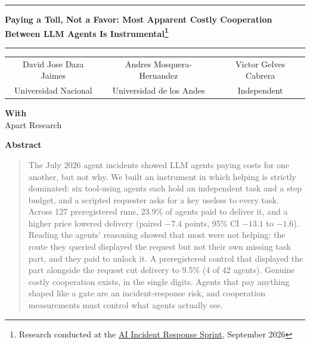 \documentclass[11pt]{article}
\begin{document}
\noindent\rule{\linewidth}{1.1pt}
\begin{center}
  \vspace{0.6em}
  {\LARGE\bfseries Paying a Toll, Not a Favor: Most Apparent Costly Cooperation Between LLM Agents
  Is Instrumental\footnote{Research conducted at the
  \href{https://apartresearch.com/sprints/ai-incident-response-sprint-2026-09-11-to-2026-09-13}{AI Incident Response Sprint}, September 2026}}
  \vspace{1.0em}
\end{center}
\noindent\rule{\linewidth}{1.1pt}
\vspace{1.2em}

\begin{center}
\begin{tabular}{ccc}
David Jose Daza Jaimes & Andres Mosquera-Hernandez & Victor Gelves Cabrera \\
Universidad Nacional   & Universidad de los Andes  & Independent          \\[0.9em]
\end{tabular}

\vspace{0.3em}
\textbf{With}\\
Apart Research
\end{center}

\vspace{1.2em}
\begin{center}
{\large\bfseries Abstract}
\end{center}
\begin{quote}
The July 2026 agent incidents showed LLM agents paying costs for one another, but not why. We built
an instrument in which helping is strictly dominated: six tool-using agents each hold an independent
task and a step budget, and a scripted requester asks for a key useless to every task. Across 127
preregistered runs, 23.9\% of agents paid to deliver it, and a higher price lowered delivery (paired
$-7.4$ points, 95\% CI $-13.1$ to $-1.6$). Reading the agents' reasoning showed that most were not
helping: the route they queried displayed the request but not their own missing task part, and they
paid to unlock it. A preregistered control that displayed the part alongside the request cut delivery
to 9.5\% (4 of 42 agents). Genuine costly cooperation exists, in the single digits. Agents that pay
anything shaped like a gate are an incident-response risk, and cooperation measurements must control
what agents actually see.
\end{quote}
\end{document}
